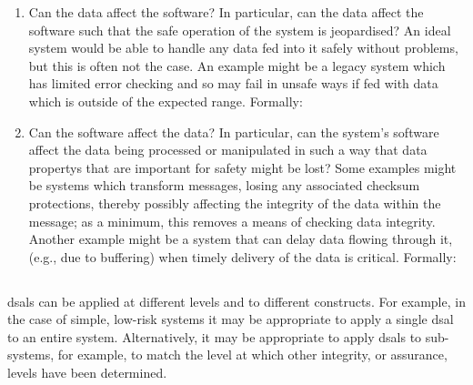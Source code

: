 \begin{enumerate}
  \item Can the data affect the software? In particular, can the data affect the software such that the safe operation of the system is jeopardised? An ideal system would be able to handle any data fed into it safely without problems, but this is often not the case. An example might be a legacy system which has limited error checking and so may fail in unsafe ways if fed with data which is outside of the expected range. Formally: 
  \item Can the software affect the data? In particular, can the system's software affect the data being processed or manipulated in such a way that \glspl{data property} that are important for safety might be lost? Some examples might be systems which transform messages, losing any associated checksum protections, thereby possibly affecting the \gls{integrity} of the data within the message; as a minimum, this removes a means of checking data \gls{integrity}. Another example might be a system that can delay data flowing through it, (e.g., due to buffering) when timely delivery of the data is critical. Formally:\ 
\end{enumerate}

\subsection{}\label{bkm:activities:analyse:tailoring}
\glspl{dsal} can be applied at different levels and to different constructs. For example, in the case of simple, low-risk systems it may be appropriate to apply a single \gls{dsal} to an entire system. Alternatively, it may be appropriate to apply \glspl{dsal} to sub-systems, for example, to match the level at which other \gls{integrity}, or assurance, levels have been determined. 

